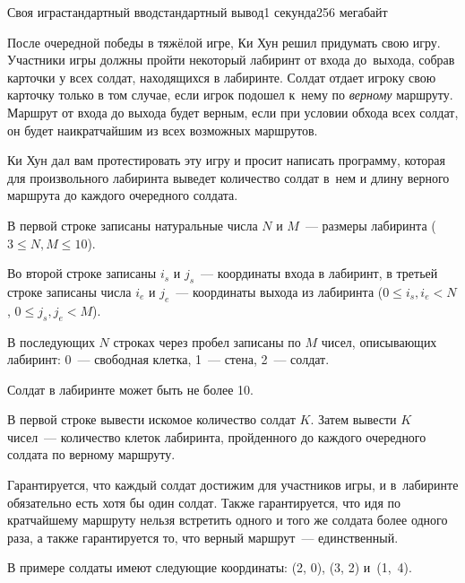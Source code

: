 \begin{problem}{Своя игра}{стандартный ввод}{стандартный вывод}{1 секунда}{256 мегабайт}

После очередной победы в тяжёлой игре, Ки Хун решил придумать свою игру. Участники игры должны пройти некоторый лабиринт от входа до~выхода, собрав карточки у всех солдат, находящихся в лабиринте. Солдат отдает игроку свою карточку только в том случае, если игрок подошел к~нему по \textit{верному} маршруту. Маршрут от входа до выхода будет верным, если при условии обхода всех солдат, он будет наикратчайшим из всех возможных маршрутов. 

Ки Хун дал вам протестировать эту игру и просит написать программу, которая для произвольного лабиринта выведет количество солдат в~нем и длину верного маршрута до каждого очередного солдата.

\InputFile
В первой строке записаны натуральные числа $N$ и $M$~--- размеры лабиринта ($3 \leq N, M \leq 10$).

Во второй строке записаны $i_s$ и $j_s$~--- координаты входа в лабиринт, в третьей строке записаны числа $i_e$ и $j_e$~--- координаты выхода из лабиринта ($0 \leq i_s, i_e < N$, $0 \leq j_s, j_e < M$). 

В последующих $N$ строках через пробел записаны по $M$ чисел, описывающих лабиринт: 0~--- свободная клетка, 1~--- стена, 2~--- солдат. 

Солдат в лабиринте может быть не более 10.

\OutputFile
В первой строке вывести искомое количество солдат $K$. Затем вывести $K$ чисел~--- количество клеток лабиринта, пройденного до каждого очередного солдата по верному маршруту.

\Example

\begin{example}
%
\end{example}

\Note
Гарантируется, что каждый солдат достижим для участников игры, и в~лабиринте обязательно есть хотя бы один солдат. Также гарантируется, что идя по кратчайшему маршруту нельзя встретить одного и того же солдата более одного раза, а также гарантируется то, что верный маршрут~--- единственный.

В примере солдаты имеют следующие координаты: (2, 0), (3, 2) \mbox{и (1, 4)}.

\end{problem}

